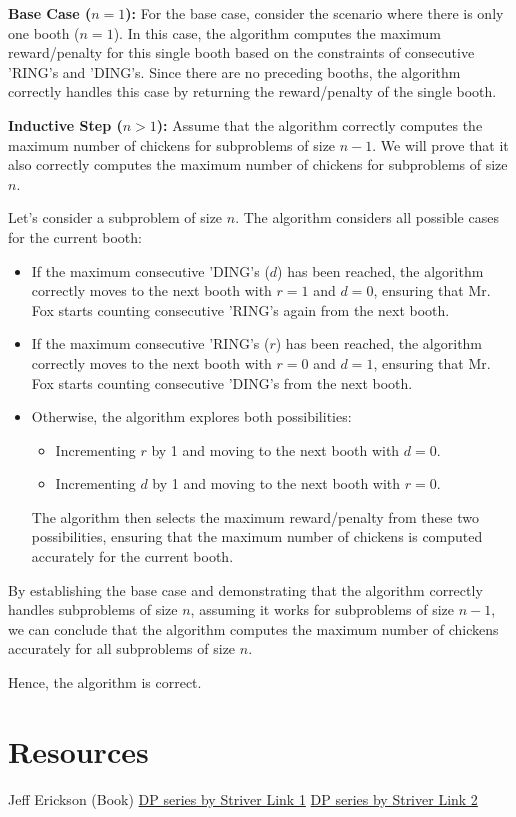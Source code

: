 \documentclass[8pt]{article}
\begin{document}
\textbf{Base Case (\( n = 1 \)):} 
For the base case, consider the scenario where there is only one booth (\( n = 1 \)). In this case, the algorithm computes the maximum reward/penalty for this single booth based on the constraints of consecutive 'RING's and 'DING's. Since there are no preceding booths, the algorithm correctly handles this case by returning the reward/penalty of the single booth.

\textbf{Inductive Step (\( n > 1 \)):}
Assume that the algorithm correctly computes the maximum number of chickens for subproblems of size \( n - 1 \). We will prove that it also correctly computes the maximum number of chickens for subproblems of size \( n \).

Let's consider a subproblem of size \( n \). The algorithm considers all possible cases for the current booth:

\begin{itemize}
    \item If the maximum consecutive 'DING's (\( d \)) has been reached, the algorithm correctly moves to the next booth with \( r = 1 \) and \( d = 0 \), ensuring that Mr. Fox starts counting consecutive 'RING's again from the next booth.
    \item If the maximum consecutive 'RING's (\( r \)) has been reached, the algorithm correctly moves to the next booth with \( r = 0 \) and \( d = 1 \), ensuring that Mr. Fox starts counting consecutive 'DING's from the next booth.
    \item Otherwise, the algorithm explores both possibilities: 
        \begin{itemize}
            \item Incrementing \( r \) by 1 and moving to the next booth with \( d = 0 \).
            \item Incrementing \( d \) by 1 and moving to the next booth with \( r = 0 \).
        \end{itemize}
    The algorithm then selects the maximum reward/penalty from these two possibilities, ensuring that the maximum number of chickens is computed accurately for the current booth.
\end{itemize}

By establishing the base case and demonstrating that the algorithm correctly handles subproblems of size \( n \), assuming it works for subproblems of size \( n - 1 \), we can conclude that the algorithm computes the maximum number of chickens accurately for all subproblems of size \( n \).

Hence, the algorithm is correct.




\section{Resources} 
Jeff Erickson (Book)
\newline
\href{https://www.youtube.com/watch?v=tyB0ztf0DNY}{DP series by Striver Link 1}
\newline
\href{https://www.youtube.com/watch?v=QGfn7JeXK54}{DP series by Striver Link 2}
\end{document}

